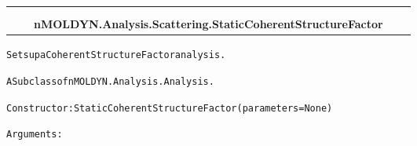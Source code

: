     \label{nMOLDYN:Analysis:Scattering:StaticCoherentStructureFactor}
\begin{tabular}{cccccc}
\multicolumn{2}{r}{\settowidth{\BCL}{nMOLDYN.Analysis.Analysis.Analysis}\multirow{2}{\BCL}{nMOLDYN.Analysis.Analysis.Analysis}}
&&
  \\\cline{3-3}
  &&\multicolumn{1}{c|}{}
&&
  \\
&&\multicolumn{2}{l}{\textbf{nMOLDYN.Analysis.Scattering.StaticCoherentStructureFactor}}
\end{tabular}

\begin{alltt}
Sets up a Coherent Structure Factor analysis.

A Subclass of nMOLDYN.Analysis.Analysis. 

Constructor: StaticCoherentStructureFactor({\textbar}parameters{\textbar} = None)

Arguments:


\end{alltt}
